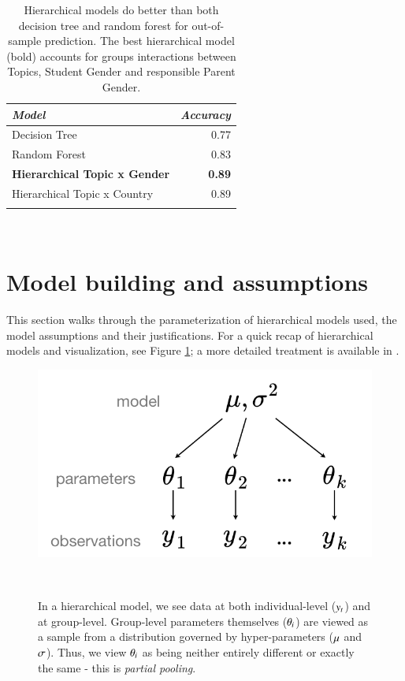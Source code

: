 \documentclass{sigchi}
\begin{document}
\pagebreak
\begin{table}
	\centering
	\begin{tabular}{l r}
		
		{\small\textit{Model}} & {\small \textit{Accuracy}} \\
		\midrule
		Decision Tree                & 0.77    \\
		Random Forest                & 0.83    \\
		\textbf{Hierarchical Topic x Gender}  & \textbf{0.89}    \\
		Hierarchical Topic x Country & 0.89    \\
		&     \\
	\end{tabular}
	\caption{
		Hierarchical models do better than both decision tree and random forest for out-of-sample prediction.
		The best hierarchical model (bold) accounts for groups interactions between Topics, Student Gender and 
		responsible Parent Gender.  	
	}~\label{tab:accuracy_results}
\end{table}


\section{Model building and assumptions}
This section walks through the parameterization of hierarchical models used, the model assumptions and their justifications. For a quick recap of hierarchical models and visualization, see Figure \ref{fig:hierarchy}; a more detailed treatment is available in \cite{gelmanbayesian}.

\begin{figure}
	\centering
	\includegraphics[width=0.95\columnwidth]{figures/hierarchy.png}
	\caption{
		In a hierarchical model, we see data at both individual-level ($\protect y_{t}$) and at group-level. Group-level parameters themselves ($\protect\theta_{i}$) are viewed as a sample from a distribution governed by hyper-parameters ($\protect\mu$ and $\protect\sigma$). 
		Thus, we view $\protect\theta_{i}$ as being neither entirely different or exactly the same - this is \textit{partial pooling}. 
	}~\label{fig:hierarchy}	
	
\end{figure}
 
\end{document}
